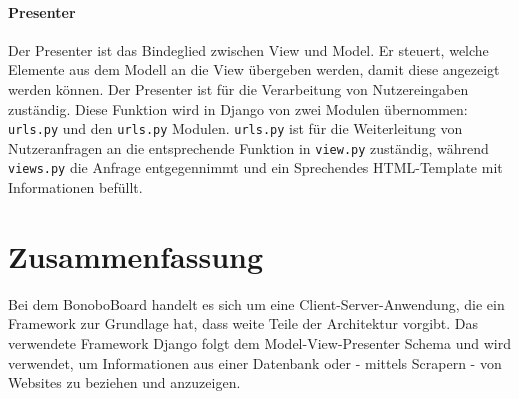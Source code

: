 \documentclass[a4paper,11pt]{scrartcl}
\begin{document}
\paragraph{Presenter}
Der Presenter ist das Bindeglied zwischen View und Model. Er steuert, welche Elemente aus dem Modell an die View übergeben werden, damit diese angezeigt werden können. Der Presenter ist für die Verarbeitung von Nutzereingaben zuständig. Diese Funktion wird in Django von zwei Modulen übernommen: \texttt{urls.py} und den \texttt{urls.py} Modulen. \texttt{urls.py} ist für die Weiterleitung von Nutzeranfragen an die entsprechende Funktion in \texttt{view.py} zuständig, während \texttt{views.py} die Anfrage entgegennimmt und ein Sprechendes HTML-Template mit Informationen befüllt.


\section{Zusammenfassung}
Bei dem BonoboBoard handelt es sich um eine Client-Server-Anwendung, die ein Framework zur Grundlage hat, dass weite Teile der Architektur vorgibt. Das verwendete Framework Django folgt dem Model-View-Presenter Schema und wird verwendet, um Informationen aus einer Datenbank oder - mittels Scrapern - von Websites zu beziehen und anzuzeigen. %


\end{document}

